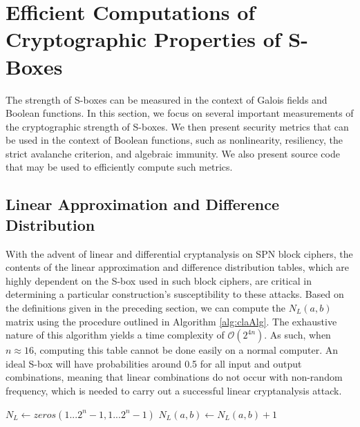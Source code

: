 \section{Efficient Computations of Cryptographic Properties of S-Boxes} \label{sec:strength}
The strength of S-boxes can be measured in the context of Galois fields and Boolean functions. In this section, we focus on several important measurements of the cryptographic strength of S-boxes. We then present security metrics that can be used in the context of Boolean functions, such as nonlinearity, resiliency, the strict avalanche criterion, and algebraic immunity. We also present source code that may be used to efficiently compute such metrics.

\subsection{Linear Approximation and Difference Distribution}
With the advent of linear and differential cryptanalysis on SPN block ciphers, the contents of the linear approximation and difference distribution tables, which are highly dependent on the S-box used in such block ciphers, are critical in determining a particular construction's susceptibility to these attacks. Based on the definitions given in the preceding section, we can compute the $N_L(a,b)$ matrix using the procedure outlined in Algorithm \ref{alg:claAlg}. The exhaustive nature of this algorithm yields a time complexity of $\mathcal{O}(2^{4n})$. As such, when $n \approx 16$, computing this table cannot be done easily on a normal computer. An ideal S-box will have probabilities around 0.5 for all input and output combinations, meaning that linear combinations do not occur with non-random frequency, which is needed to carry out a successful linear cryptanalysis attack.

\begin{algorithm}[ht!] %
\caption{$N_L(S, n$)} \label{alg:claAlg}
\begin{algorithmic}[1]
\State $N_L \gets zeros(1...2^n - 1,1...2^n - 1)$
						\State $N_L(a,b) \gets N_L(a,b) + 1$
					\EndIf		
				\EndFor
			\EndFor
		\EndFor
	\EndFor
\end{algorithmic}
\end{algorithm}

